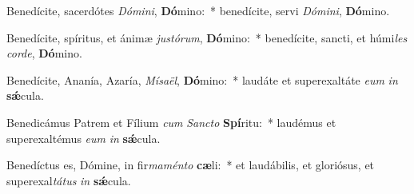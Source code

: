 \item Benedícite, sacerdótes \textit{Dó}\textit{mi}\textit{ni}, \textbf{Dó}mino:~* benedícite, servi \textit{Dó}\textit{mi}\textit{ni}, \textbf{Dó}mino.
\item Benedícite, spíritus, et ánimæ \textit{jus}\textit{tó}\textit{rum}, \textbf{Dó}mino:~* benedícite, sancti, et húmi\textit{les} \textit{cor}\textit{de}, \textbf{Dó}mino.
\item Benedícite, Ananía, Azaría, \textit{Mí}\textit{sa}\textit{ël}, \textbf{Dó}mino:~* laudáte et superexaltáte \textit{e}\textit{um} \textit{in} \textbf{sǽ}cula.
\item Benedicámus Patrem et Fílium \textit{cum} \textit{Sanc}\textit{to} \textbf{Spí}ritu:~* laudémus et superexaltémus \textit{e}\textit{um} \textit{in} \textbf{sǽ}cula.
\item Benedíctus es, Dómine, in fir\textit{ma}\textit{mén}\textit{to} \textbf{cæ}li:~* et laudábilis, et gloriósus, et superexal\textit{tá}\textit{tus} \textit{in} \textbf{sǽ}cula.
